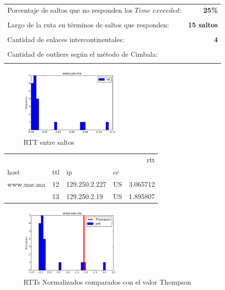 \begin{center}
\begin{tabular}{p{6.5cm}r}
Porcentaje de saltos que no responden los $Time$ $exceeded$: & \textbf{25\%} \\ \\ 
Largo de la ruta en términos de saltos que responden: &\textbf{15 saltos} \\ \\
Cantidad de enlaces intercontinentales: & \textbf{4} \\ \\
Cantidad de outliers según el método de Cimbala: & \textbf{} \\ \\
\end{tabular}
\end{center}


\begin{figure}[H]
  \centering
    \includegraphics[width=0.45\textwidth]{histogramas_rtt/www-uae-ma.png}
  \caption{RTT entre saltos}
  \label{entropia-s}
\end{figure}

\begin{center}
\begin{tabular}{llllr}
\toprule
           &    &              &    &       rtt \\
host & ttl & ip & cc &           \\
\midrule
www.uae.ma & 12 & 129.250.2.227 & US &  3.065712 \\
           & 13 & 129.250.2.19 & US &  1.895807 \\
\bottomrule
\end{tabular}

\end{center}

\begin{figure}[H]
  \centering
    \includegraphics[width=0.45\textwidth]{histogramas_thompson/www-uae-ma.png}
  \caption{RTTs Normalizados comparados con el valor Thompson}
  \label{entropia-s}
\end{figure}

